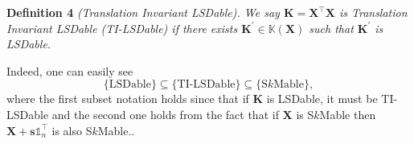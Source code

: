 \documentclass[journal]{IEEEtran}
\begin{document}
\newenvironment{definition4}[1]{\par\noindent\textbf{Definition 4} \it}{}
\begin{definition4}((Translation Invariant LSDable).
	We say $\mathbf{K}=\mathbf{X}^\top\mathbf{X}$ is Translation Invariant LSDable (TI-LSDable) if there exists
	$
	\mathbf{K}^\prime \in \mathbb{K}(\mathbf{X})
	$ such that $\mathbf{K}^\prime$ is LSDable.
\end{definition4}

Indeed, one can easily see 
\[
\{\text{LSDable}\} \subseteq \{\text{TI-LSDable}\} \subseteq \{\text{S$k$Mable}\},
\]
where the first subset notation holds since that if $\mathbf{K}$ is LSDable, it must be TI-LSDable 
and the second one holds from the fact that if $\mathbf{X}$ is S$k$Mable then $\mathbf{X}+\mathbf{s}\mathbb{1}_n^\top$ is also S$k$Mable..
\end{document}
